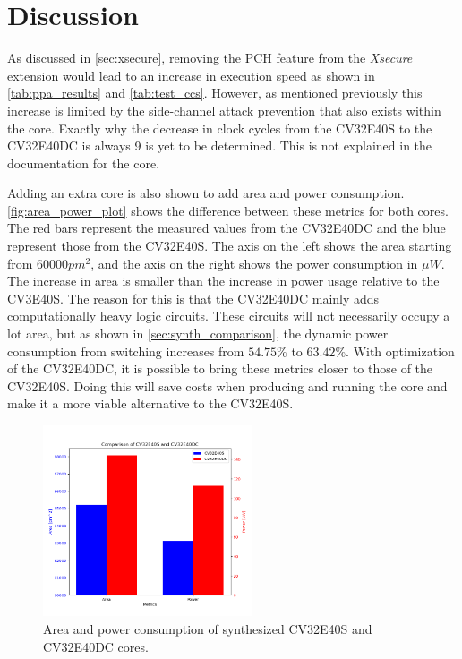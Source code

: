 \section{Discussion}
\label{sec:discussion}

As discussed in \autoref{sec:xsecure}, removing the PCH feature from the \textit{Xsecure} extension would lead to an increase in execution speed as shown in \autoref{tab:ppa_results} and \autoref{tab:test_ccs}. However, as mentioned previously this increase is limited by the side-channel attack prevention that also exists within the core. Exactly why the decrease in clock cycles from the CV32E40S to the CV32E40DC is always 9 is yet to be determined. This is not explained in the documentation for the core.  

Adding an extra core is also shown to add area and power consumption. \autoref{fig:area_power_plot} shows the difference between these metrics for both cores. The red bars represent the measured values from the CV32E40DC and the blue represent those from the CV32E40S. The axis on the left shows the area starting from 60000$pm^2$, and the axis on the right shows the power consumption in $\mu W$. The increase in area is smaller than the increase in power usage relative to the CV3E40S. The reason for this is that the CV32E40DC mainly adds computationally heavy logic circuits. These circuits will not necessarily occupy a lot area, but as shown in \autoref{sec:synth_comparison}, the dynamic power consumption from switching increases from $54.75\%$ to $63.42\%$. With optimization of the CV32E40DC, it is possible to bring these metrics closer to those of the CV32E40S. Doing this will save costs when producing and running the core and make it a more viable alternative to the CV32E40S. 

\begin{figure}[h!]
    \centering
    \includegraphics[width=0.55\textwidth]{docs/images/area_power_both_cores.png}
    \caption{Area and power consumption of synthesized CV32E40S and CV32E40DC cores. }
    \label{fig:area_power_plot}
\end{figure}

